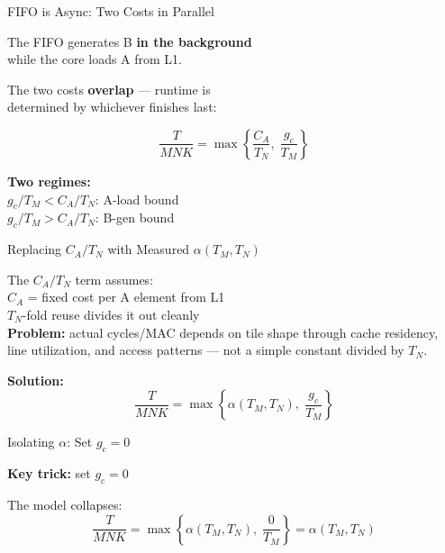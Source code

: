 \documentclass[aspectratio=169]{beamer}
\begin{document}
\begin{frame}{FIFO is Async: Two Costs in Parallel}


    \begin{center}
      The FIFO generates B \textbf{in the background}\\
      while the core loads A from L1.

      \medskip
      The two costs \textbf{overlap} --- runtime is\\
      determined by whichever finishes last:

      \[
        \frac{T}{MNK} = \max\!\left\{\frac{C_A}{T_N},\;\frac{g_c}{T_M}\right\}
      \]

      \medskip
      \textbf{Two regimes:}\\
      \medskip
      $g_c/T_M < C_A/T_N$:\; A-load bound\\
      $g_c/T_M > C_A/T_N$:\; B-gen bound\\
    \end{center}
\end{frame}

\begin{frame}{Replacing $C_A/T_N$ with Measured $\alpha(T_M,T_N)$}
    \begin{center}
      The $C_A/T_N$ term assumes:\\
    \medskip
        $C_A$ = fixed cost per A element from L1\\
        $T_N$-fold reuse divides it out cleanly\\

      \medskip
      \textbf{Problem:} actual cycles/MAC depends on
      tile shape through cache residency, line
      utilization, and access patterns ---
      not a simple constant divided by $T_N$.

      \medskip
      \textbf{Solution:} 
      \[
          \boxed{\frac{T}{MNK} = \max\!\left\{
          \alpha(T_M,T_N),\;\frac{g_c}{T_M}
          \right\}}
      \]

    \end{center}
\end{frame}

\begin{frame}{Isolating $\alpha$: Set $g_c = 0$}
    \begin{center}
      \textbf{Key trick:} set $g_c = 0$

      \medskip
      The model collapses:
      \[
        \frac{T}{MNK} = \max\!\left\{\alpha(T_M,T_N),\;\frac{0}{T_M}\right\}
        = \alpha(T_M,T_N)
      \]
    \end{center}
\end{frame}
\end{document}

